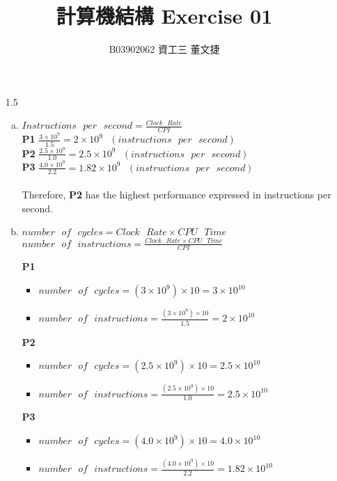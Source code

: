 \documentclass[12pt, a4paper]{article}
\date{}
\title{\vspace{-3.0cm} 計算機結構 \hspace{0cm} Exercise 01 \\ \vspace{0cm}}
\author{\normalsize B03902062 \hspace{0cm} 資工三 \hspace{0cm} 董文捷}
\begin{document}
\maketitle
\begin{itemize}[font=\bfseries]

\item[1.5]
\begin{enumerate}[a.]

\item
$Instructions\mbox{ }per\mbox{ }second = \frac{Clock\mbox{ }Rate}{CPI}$ \\
{\bf P1} \hspace{0.2cm} $\frac{3 \times 10^9}{1.5} = 2 \times 10^9\mbox{ }(instructions\mbox{ }per\mbox{ }second)$ \\
{\bf P2} \hspace{0.2cm} $\frac{2.5 \times 10^9}{1.0} = 2.5 \times 10^9\mbox{ }(instructions\mbox{ }per\mbox{ }second)$ \\
{\bf P3} \hspace{0.2cm} $\frac{4.0 \times 10^9}{2.2} = 1.82 \times 10^9\mbox{ }(instructions\mbox{ }per\mbox{ }second)$ \\
\\
Therefore, {\bf P2} has the highest performance expressed in instructions per second.

\item
$number\mbox{ }of\mbox{ }cycles = Clock\mbox{ }Rate \times CPU\mbox{ }Time$ \\ 
$number\mbox{ }of\mbox{ }instructions = \frac{Clock\mbox{ }Rate \times CPU\mbox{ }Time}{CPI}$ 

{\bf P1}
\begin{itemize}
\item $number\mbox{ }of\mbox{ }cycles = (3 \times 10^9) \times 10 = 3 \times 10^{10}$
\item $number\mbox{ }of\mbox{ }instructions = \frac{(3 \times 10^9) \times 10}{1.5} = 2 \times 10^{10}$
\end{itemize}

{\bf P2}
\begin{itemize}
\item $number\mbox{ }of\mbox{ }cycles = (2.5 \times 10^9) \times 10 = 2.5 \times 10^{10}$
\item $number\mbox{ }of\mbox{ }instructions = \frac{(2.5 \times 10^9) \times 10}{1.0} = 2.5 \times 10^{10}$
\end{itemize}

{\bf P3}
\begin{itemize}
\item $number\mbox{ }of\mbox{ }cycles = (4.0 \times 10^9) \times 10 = 4.0 \times 10^{10}$
\item $number\mbox{ }of\mbox{ }instructions = \frac{(4.0 \times 10^9) \times 10}{2.2} = 1.82 \times 10^{10}$
\end{itemize}


\end{enumerate}
\end{itemize}
\end{document}
